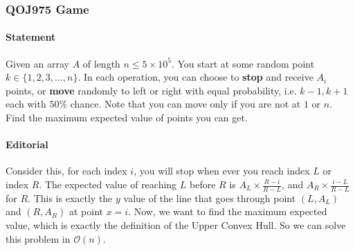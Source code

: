 \subsubsection{QOJ975 Game}


\paragraph{Statement}
Given an array $A$ of length $n \le 5 \times 10^5$.
You start at some random point $k \in \{1, 2, 3, \dots, n\}$.
In each operation, you can choose to \textbf{stop} and receive $A_i$ points, or \textbf{move} randomly to left or right with equal probability, i.e. $k-1, k+1$ each with $50\%$ chance.
Note that you can move only if you are not at $1$ or $n$.
Find the maximum expected value of points you can get.

\paragraph{Editorial}
Consider this, for each index $i$, you will stop when ever you reach index $L$ or index $R$.
The expected value of reaching $L$ before $R$ is $A_L \times \frac{R-i}{R-L}$, and $A_R \times \frac{i-L}{R-L}$ for $R$.
This is exactly the $y$ value of the line that goes through point $(L, A_L)$ and $(R, A_R)$ at point $x = i$.
Now, we want to find the maximum expected value, which is exactly the definition of the Upper Convex Hull.
So we can solve this problem in $\mathcal{O}(n)$.


